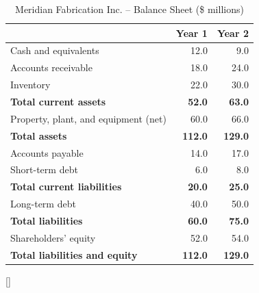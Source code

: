 \documentclass[../ai_in_finance]{subfiles}
\begin{document}
\begin{table}[htbp]
\centering
\begin{lrbox}{\bookmeasuredbox}
\begin{tabular}{lrr}
\toprule
 & Year 1 & Year 2 \\
\midrule
Cash and equivalents            & 12.0 & 9.0 \\
Accounts receivable             & 18.0 & 24.0 \\
Inventory                       & 22.0 & 30.0 \\
\textbf{Total current assets}   & \textbf{52.0} & \textbf{63.0} \\
Property, plant, and equipment (net) & 60.0 & 66.0 \\
\textbf{Total assets}           & \textbf{112.0} & \textbf{129.0} \\
\midrule
Accounts payable                & 14.0 & 17.0 \\
Short-term debt                 & 6.0  & 8.0 \\
\textbf{Total current liabilities} & \textbf{20.0} & \textbf{25.0} \\
Long-term debt                  & 40.0 & 50.0 \\
\textbf{Total liabilities}      & \textbf{60.0} & \textbf{75.0} \\
Shareholders' equity            & 52.0 & 54.0 \\
\textbf{Total liabilities and equity} & \textbf{112.0} & \textbf{129.0} \\
\bottomrule
\end{tabular}
\end{lrbox}
\ifdim\wd\bookmeasuredbox<0.65\linewidth
\setlength{\bookcapwidth}{0.65\linewidth}
\else
\setlength{\bookcapwidth}{\wd\bookmeasuredbox}
\fi
{}[\bookcapwidth]{
\usebox{\bookmeasuredbox}
}{
\caption{Meridian Fabrication Inc. -- Balance Sheet (\$ millions)}
\label{tab:meridian_bs}
}
\end{table}
\end{document}
